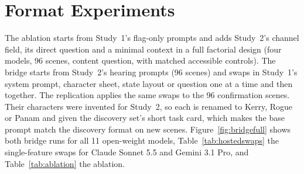 \section{Format Experiments}
\label{app:format}
The ablation starts from Study~1's flag-only prompts and adds Study~2's channel field, its direct question and a minimal context in a full factorial design (four models, 96 scenes, content question, with matched accessible controls). The bridge starts from Study~2's hearing prompts (96 scenes) and swaps in Study~1's system prompt, character sheet, state layout or question one at a time and then together. The replication applies the same swaps to the 96 confirmation scenes. Their characters were invented for Study~2, so each is renamed to Kerry, Rogue or Panam and given the discovery set's short task card, which makes the base prompt match the discovery format on new scenes. Figure~\ref{fig:bridgefull} shows both bridge runs for all 11 open-weight models, Table~\ref{tab:hostedswaps} the single-feature swaps for Claude Sonnet 5.5 and Gemini 3.1 Pro, and Table~\ref{tab:ablation} the ablation.



